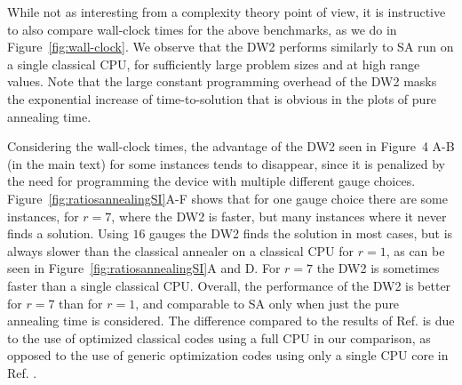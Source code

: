 While not as interesting from a complexity theory point of view, it is instructive to also compare wall-clock times for the above benchmarks, as we do in
Figure~\ref{fig:wall-clock}. We observe that the DW2 performs similarly to SA run on a single classical CPU, for sufficiently large problem sizes and at high range values. Note that the large constant programming overhead of the DW2 masks the exponential increase of time-to-solution that is obvious in the plots of pure annealing time.





Considering the wall-clock times, the advantage of the DW2 seen in Figure~4 A-B (in the main text) for some instances tends to disappear, since it is penalized by the need for programming the device with multiple different gauge choices. Figure~\ref{fig:ratiosannealingSI}A-F shows that for one gauge choice there are some instances, for $r=7$, where the DW2 is faster, but many instances where it never finds a solution. Using $16$ gauges the DW2 finds the solution in most cases, but is always slower than the classical annealer on a classical CPU for $r=1$, as can be seen in Figure~\ref{fig:ratiosannealingSI}A and D. For $r=7$ the DW2 is sometimes faster than a single classical CPU. Overall, the performance of the DW2 is better for $r=7$ than for $r=1$, and comparable to SA only when just the pure annealing time is considered. The difference compared to the results of Ref. \cite{McGeoch} is due to the use of optimized classical codes using a full CPU in our comparison, as opposed to the use of generic optimization codes using only a single CPU core in Ref. \cite{McGeoch}.\\


